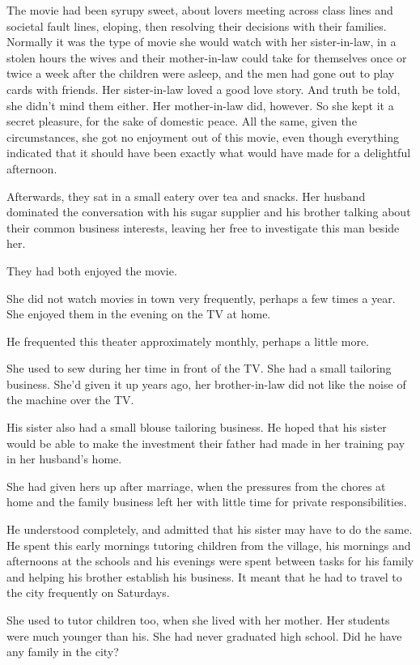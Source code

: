 \documentclass{article}
\begin{document}
The movie had been syrupy sweet, about lovers meeting across class lines and societal fault lines, eloping, then resolving their decisions with their families. Normally it was the type of movie she would watch with her sister-in-law, in a stolen hours the wives and their mother-in-law could take for themselves once or twice a week after the children were asleep, and the men had gone out to play cards with friends. Her sister-in-law loved a good love story. And truth be told, she didn't mind them either. Her mother-in-law did, however. So she kept it a secret pleasure, for the sake of domestic peace. All the same, given the circumstances, she got no enjoyment out of this movie, even though everything indicated that it should have been exactly what would have made for a delightful afternoon.

Afterwards, they sat in a small eatery over tea and snacks. Her husband dominated the conversation with his sugar supplier and his brother talking about their common business interests, leaving her free to investigate this man beside her. 

They had both enjoyed the movie. 

She did not watch movies in town very frequently, perhaps a few times a year. She enjoyed them in the evening on the TV at home. 

He frequented this theater approximately monthly, perhaps a little more. 

She used to sew during her time in front of the TV. She had a small tailoring business. She'd given it up years ago, her brother-in-law did not like the noise of the machine over the TV.

His sister also had a small blouse tailoring business. He hoped that his sister would be able to make the investment their father had made in her training pay in her husband's home.

She had given hers up after marriage, when the pressures from the chores at home and the family business left her with little time for private responsibilities. 

He understood completely, and admitted that his sister may have to do the same.  He spent this early mornings tutoring children from the village, his mornings and afternoons at the schools and his evenings were spent between tasks for his family and helping his brother establish his business. It meant that he had to travel to the city frequently on Saturdays.

She used to tutor children too, when she lived with her mother. Her students were much younger than his. She had never graduated high school. Did he have any family in the city? 
\end{document}

